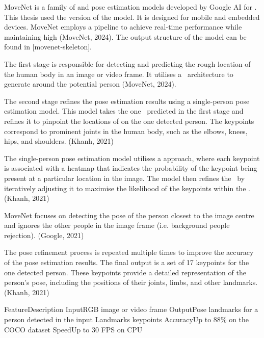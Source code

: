 
MoveNet is a family of  and  pose estimation models developed by Google AI for  \HPE. This thesis used the  version of the model. It is designed for mobile and embedded devices. MoveNet employs a  pipeline to achieve real-time performance while maintaining high  (\scc MoveNet, 2024). The output structure of the  model can be found in [movenet-skeleton].

The first stage is responsible for detecting and predicting the rough location of the human body in an image or video frame. It utilises a \SSD\ architecture to generate \pojem{\BBOX} around the potential person (\scc MoveNet, 2024).

The second stage refines the pose estimation results using a single-person pose estimation model. This model takes the one \BBOX\ predicted in the first stage and refines it to pinpoint the locations of  on the one detected person. The keypoints correspond to prominent joints in the human body, such as the elbows, knees, hips, and shoulders. (\scc Khanh, 2021)

The single-person pose estimation model utilises a  approach, where each keypoint is associated with a heatmap that indicates the probability of the keypoint being present at a particular location in the image. The model then refines the \BBOX\ by iteratively adjusting it to maximise the likelihood of the keypoints within the \BBOX. (\scc Khanh, 2021)

MoveNet focuses on detecting the pose of the person closest to the image centre and ignores the other people in the image frame (i.e. background people rejection). (\scc Google, 2021)

The pose refinement process is repeated multiple times to improve the accuracy of the pose estimation results. The final output is a set of 17 keypoints for the one detected person. These keypoints provide a detailed representation of the person's pose, including the positions of their joints, limbs, and other landmarks. (\scc Khanh, 2021)

 \setupTABLE[r][1][style=bold]
 \setupTABLE[c][each][offset=3dd]
 \setupTABLE[frame=off]
 \setupTABLE[r][1][topframe=on,bottomframe=on]
 \setupTABLE[r][6][bottomframe=on]
 \setupTABLE[c][each][leftframe=on]
 \setupTABLE[c][1][leftframe=off]
 \bTR\bTD Feature\eTD\bTD Description\eTD\eTR
 \bTR\bTD Input\eTD\bTD RGB image or video frame\eTD\eTR
 \bTR\bTD Output\eTD\bTD Pose landmarks for a person detected in the input\eTD\eTR
 \bTR\bTD Landmarks\eTD{} keypoints\eTD\eTR
 \bTR\bTD Accuracy\eTD\bTD Up to 88\% on the COCO dataset\eTD\eTR
 \bTR\bTD Speed\eTD\bTD Up to 30 FPS on CPU\eTD\eTR

